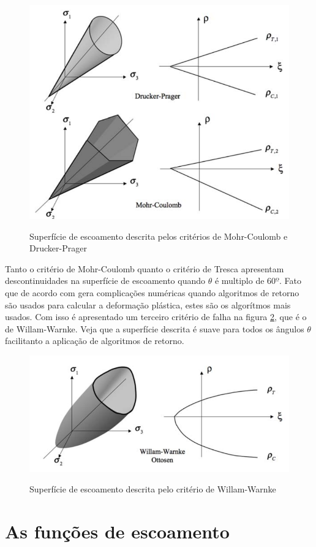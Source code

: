 \begin{figure}
    \centering
    \caption{Superfície de escoamento descrita pelos critérios de Mohr-Coulomb e Drucker-Prager}
    \includegraphics[width=0.7\linewidth]{images/tmohrdrucker.png}
    \label{fig:mohrDrucker}
\end{figure}

Tanto o critério de Mohr-Coulomb quanto o critério de Tresca apresentam descontinuidades na superfície de escoamento quando $\theta$ é multiplo de $ 60º $. Fato que de acordo com  \cite{hiermaier_2008} gera complicações numéricas quando algoritmos de retorno são usados para calcular a deformação plástica, estes são os algorítmos mais usados. Com isso é apresentado um terceiro critério de falha na figura \ref{fig:Willamwarnke}, que é o de Willam-Warnke. Veja que a superfície descrita é suave para todos os ângulos $\theta$ facilitanto a aplicação de algoritmos de retorno. 

\begin{figure}
    \centering
    \caption{Superfície de escoamento descrita pelo critério de Willam-Warnke}
    \includegraphics[width=0.7\linewidth]{images/willianwarnke.png} 
    \label{fig:Willamwarnke}
\end{figure}

\section{As funções de escoamento}

